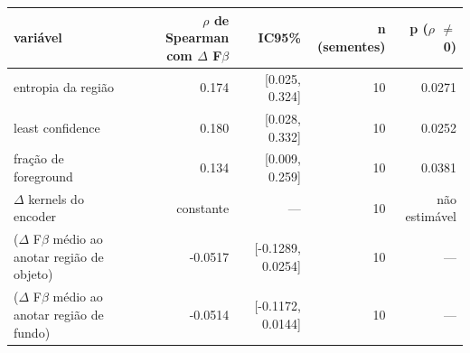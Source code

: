 \begin{tabular}{lrrrr}
\hline
variável & $\rho$ de Spearman com $\Delta$ F$\beta$ & IC95\% & n (sementes) & p ($\rho$ $\neq$ 0) \\
\hline
entropia da região & 0.174 & [0.025, 0.324] & 10 & 0.0271 \\
least confidence & 0.180 & [0.028, 0.332] & 10 & 0.0252 \\
fração de foreground & 0.134 & [0.009, 0.259] & 10 & 0.0381 \\
$\Delta$ kernels do encoder & constante & --- & 10 & não estimável \\
($\Delta$ F$\beta$ médio ao anotar região de objeto) & -0.0517 & [-0.1289, 0.0254] & 10 & --- \\
($\Delta$ F$\beta$ médio ao anotar região de fundo) & -0.0514 & [-0.1172, 0.0144] & 10 & --- \\
\hline
\end{tabular}
